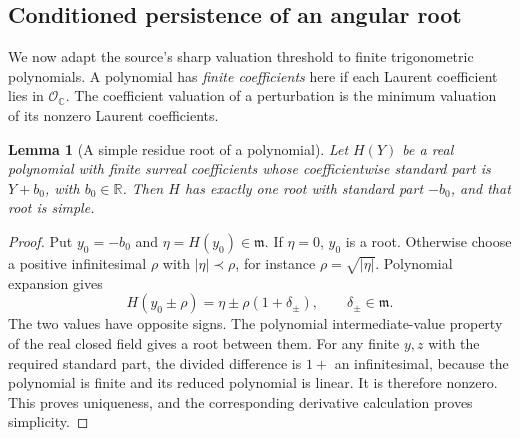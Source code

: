 \documentclass[11pt,letterpaper]{article}
\newtheorem{lemma}[theorem]{Lemma}
\theoremstyle{definition}
\theoremstyle{remark}
\newcommand{\R}{\mathbb R}\newcommand{\C}{\mathbb C}
\newcommand{\OO}{\mathcal O}\newcommand{\mm}{\mathfrak m}
\numberwithin{equation}{section}
\begin{document}
\subsection{Conditioned persistence of an angular root}
We now adapt the source's sharp valuation threshold to finite trigonometric polynomials. A polynomial has \emph{finite coefficients} here if each Laurent coefficient lies in $\OO_\C$. The coefficient valuation of a perturbation is the minimum valuation of its nonzero Laurent coefficients.

\begin{lemma}[A simple residue root of a polynomial]\label{lem:hensel}
Let $H(Y)$ be a real polynomial with finite surreal coefficients whose coefficientwise standard part is $Y+b_0$, with $b_0\in\R$. Then $H$ has exactly one root with standard part $-b_0$, and that root is simple.
\end{lemma}
\begin{proof}
Put $y_0=-b_0$ and $\eta=H(y_0)\in\mm$. If $\eta=0$, $y_0$ is a root. Otherwise choose a positive infinitesimal $\rho$ with $|\eta|\prec\rho$, for instance $\rho=\sqrt{|\eta|}$. Polynomial expansion gives
\[
 H(y_0\pm\rho)=\eta\pm\rho(1+\delta_\pm),\qquad\delta_\pm\in\mm.
\]
The two values have opposite signs. The polynomial intermediate-value property of the real closed field gives a root between them. For any finite $y,z$ with the required standard part, the divided difference is $1+$ an infinitesimal, because the polynomial is finite and its reduced polynomial is linear. It is therefore nonzero. This proves uniqueness, and the corresponding derivative calculation proves simplicity.
\end{proof}
\end{document}
